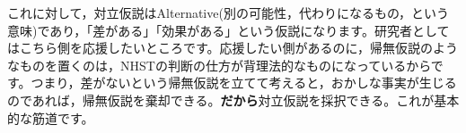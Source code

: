 \documentclass{ltjsbook}
\begin{document}
これに対して，対立仮説はAlternative(別の可能性，代わりになるもの，という意味)であり，「差がある」「効果がある」という仮説になります。研究者としてはこちら側を応援したいところです。応援したい側があるのに，帰無仮説のようなものを置くのは，NHSTの判断の仕方が背理法的なものになっているからです。つまり，差がないという帰無仮説を立てて考えると，おかしな事実が生じるのであれば，帰無仮説を棄却できる。\textbf{だから}対立仮説を採択できる。これが基本的な筋道です。




\end{document}
